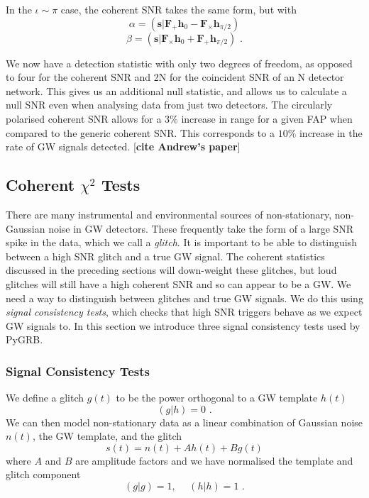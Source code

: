 \documentclass[11pt]{cuthesis}
\newcommand{\fs}{\text{ .}}
\begin{document}
In the $\iota \sim \pi$ case, the coherent SNR takes the same form, but with
\begin{equation}
\alpha = (\textbf{s}|\textbf{F}_+\textbf{h}_0 - \textbf{F}_\times \textbf{h}_{\pi /2} )
\end{equation}
\begin{equation}
\beta =  (\textbf{s}|\textbf{F}_\times\textbf{h}_0 + \textbf{F}_+ \textbf{h}_{\pi /2} ) \fs
\end{equation}

We now have a detection statistic with only two degrees of freedom, as opposed to four for the coherent SNR and 2N for the coincident SNR of an N detector network. This gives us an additional null statistic, and allows us to calculate a null SNR even when analysing data from just two detectors. The circularly polarised coherent SNR allows for a $3\%$ increase in range for a given FAP when compared to the generic coherent SNR. This corresponds to a $10\%$ increase in the rate of GW signals detected. [\textbf{cite Andrew's paper}]

\subsection{Coherent $\chi^2$ Tests} \label{sec:coh chisq}
There are many instrumental and environmental sources of non-stationary, non-Gaussian noise in GW detectors. These frequently take the form of a large SNR spike in the data, which we call a \textit{glitch}. It is important to be able to distinguish between a high SNR glitch and a true GW signal.  The coherent statistics discussed in the preceding sections will down-weight these glitches, but loud glitches will still have a high coherent SNR and so can appear to be a GW. We need a way to distinguish between glitches and true GW signals. We do this using \textit{signal consistency tests}, which checks that high SNR triggers behave as we expect GW signals to. In this section we introduce three signal consistency tests used by PyGRB.

\subsubsection{Signal Consistency Tests }
We define a glitch $g(t)$ to be the power orthogonal to a GW template $h(t)$
\begin{equation}
(g|h)=0 \fs
\end{equation}
We can then model non-stationary data as a linear combination of Gaussian noise $n(t)$, the GW template, and the glitch
\begin{equation}
s(t) = n(t) + Ah(t) + Bg(t)
\end{equation}
where $A$ and $B$ are amplitude factors and we have normalised the template and glitch component
\begin{equation}
(g|g)=1, \hspace{15pt} (h|h)=1 \fs
\end{equation}
\end{document}
